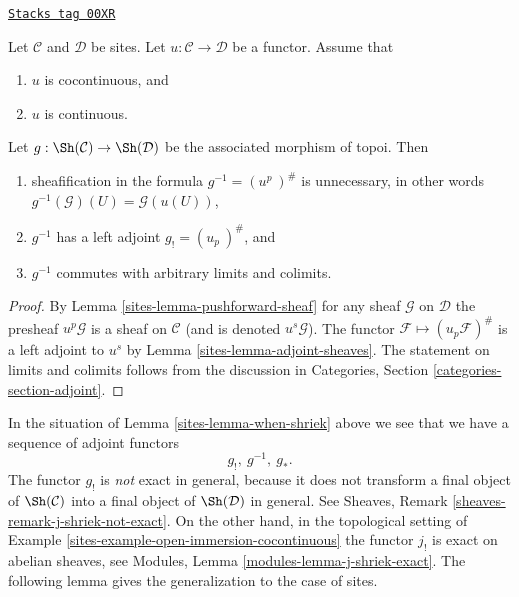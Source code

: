\begin{lemma}
\label{sites-lemma-when-shriek}
\href{https://stacks.math.columbia.edu/tag/00XR}{\texttt{Stacks tag 00XR}}


Let $\mathcal{C}$ and $\mathcal{D}$ be sites.
Let $u : \mathcal{C} \to \mathcal{D}$ be a functor.
Assume that
\begin{enumerate}
\item[(a)] $u$ is cocontinuous, and
\item[(b)] $u$ is continuous.
\end{enumerate}
Let $g : \Sh(\mathcal{C}) \to \Sh(\mathcal{D})$
be the associated morphism of topoi. Then
\begin{enumerate}
\item sheafification in the formula $g^{-1} = (u^p\ )^\#$ is
unnecessary, in other words $g^{-1}(\mathcal{G})(U) = \mathcal{G}(u(U))$,
\item $g^{-1}$ has a left adjoint $g_{!} = (u_p\ )^\#$, and
\item $g^{-1}$ commutes with arbitrary limits and colimits.
\end{enumerate}
\end{lemma}

\begin{proof}

By Lemma \ref{sites-lemma-pushforward-sheaf} for any sheaf $\mathcal{G}$
on $\mathcal{D}$ the presheaf $u^p\mathcal{G}$ is a sheaf on $\mathcal{C}$
(and is denoted $u^s\mathcal{G}$). The functor
$\mathcal{F} \mapsto (u_p\mathcal{F})^\#$ is a left
adjoint to $u^s$ by Lemma \ref{sites-lemma-adjoint-sheaves}.
The statement on limits and colimits follows from the
discussion in Categories, Section \ref{categories-section-adjoint}.
\end{proof}

In the situation of Lemma \ref{sites-lemma-when-shriek} above we see that we have
a sequence of adjoint functors
$$
g_{!}, \ g^{-1}, \ g_*.
$$
The functor $g_!$ is {\it not} exact in general, because it does
not transform a final object of $\Sh(\mathcal{C})$
into a final object of $\Sh(\mathcal{D})$ in general.
See Sheaves, Remark \ref{sheaves-remark-j-shriek-not-exact}.
On the other hand, in the topological setting of
Example \ref{sites-example-open-immersion-cocontinuous} the functor
$j_!$ is exact on abelian sheaves, see
Modules, Lemma \ref{modules-lemma-j-shriek-exact}. The following lemma gives
the generalization to the case of sites.

